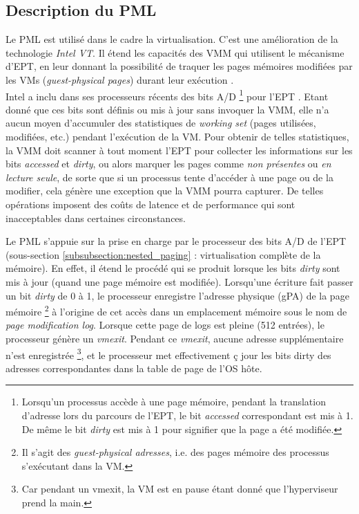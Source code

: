 \subsection{Description du PML}
Le \acs{PML} est utilisé dans le cadre la virtualisation. C'est une amélioration de la technologie \textit{\ac{Intel VT}}. Il étend les capacités des VMM qui utilisent le mécanisme d'\acs{EPT}, en leur donnant la possibilité de traquer les pages mémoires modifiées par les \acs{VMs} (\textit{guest-physical pages}) durant leur exécution \cite{online5}.\\
Intel a inclu dans ses processeurs récents des bits \ac{A/D} \footnote{Lorsqu'un processus accède à une page mémoire, pendant la translation d'adresse lors du parcours de l'EPT, le bit \textit{accessed} correspondant est mis à 1. De même le bit \textit{dirty} est mis à 1 pour signifier que la page a été modifiée.} pour l'\acs{EPT} \cite{book3}. Etant donné que ces bits sont définis ou mis à jour sans invoquer la VMM, elle n'a aucun moyen d'accumuler des statistiques de \textit{working set} (pages utilisées, modifiées, etc.) pendant l'exécution de la VM. Pour obtenir de telles statistiques, la VMM doit scanner à tout moment l'EPT pour collecter les informations sur les bits \textit{accessed} et \textit{dirty}, ou alors marquer les pages comme \textit{non présentes} ou \emph{en lecture seule}, de sorte que si un processus tente d'accéder à une page ou de la modifier, cela génère une exception que la VMM pourra capturer. De telles opérations imposent des coûts de latence et de performance qui sont inacceptables dans certaines circonstances.\\

\par\noindent Le PML s'appuie sur la prise en charge par le processeur des bits \acs{A/D} de l'\acs{EPT} (sous-section \ref{subsubsection:nested_paging} : virtualisation complète de la mémoire). En effet, il étend le procédé qui se produit lorsque les bits \textit{dirty} sont mis à jour (quand une page mémoire est modifiée). Lorsqu'une écriture fait passer un bit \textit{dirty} de 0 à 1, le processeur enregistre l'adresse physique (\acs{gPA}) de la page mémoire \footnote{Il s'agit des \textit{guest-physical adresses}, i.e. des pages mémoire des processus s'exécutant dans la VM.} à l'origine de cet accès dans un emplacement mémoire sous le nom de \textit{page modification log}. Lorsque cette page de logs est pleine (512 entrées), le processeur génère un \textit{vmexit}. Pendant ce \textit{vmexit}, aucune adresse supplémentaire n'est enregistrée \footnote{Car pendant un vmexit, la VM est en pause étant donné que l'hyperviseur prend la main.}, et le processeur met effectivement ç jour les bits dirty des adresses correspondantes dans la table de page de l'OS hôte.\\

